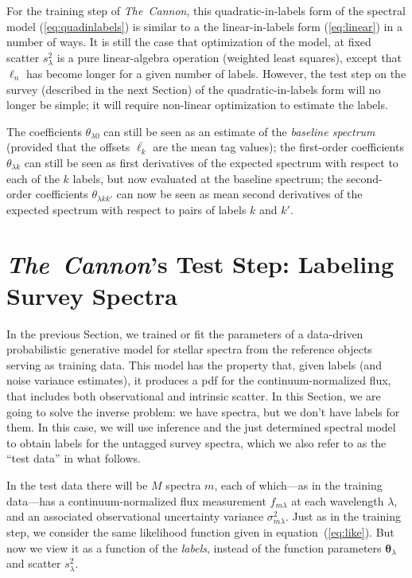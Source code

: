 \documentclass[12pt, preprint]{aastex}
\newcommand{\sectionname}{Section}
\newcommand{\tc}{\textsl{The~Cannon}}
\newcommand{\set}[1]{\bm{#1}}
\newcommand{\starlabel}{\ell}
\newcommand{\starlabelvec}{\set{\starlabel}}
\newcommand{\mean}[1]{\overline{#1}}
\begin{document}
For the training step of \tc , this quadratic-in-labels form of the spectral model (\ref{eq:quadinlabels}) is similar to a the linear-in-labels form (\ref{eq:linear}) in a number
of ways.
It is still the case that optimization of the model, at fixed scatter
$s_\lambda^2$ is a pure linear-algebra operation (weighted least
squares), except that $\starlabelvec_n$ has become longer for a given number of labels. 
However, the test step on the survey (described in the next Section) of the quadratic-in-labels form
 will no longer be simple; it will require non-linear
optimization to estimate the labels.

The coefficients $\theta_{\lambda 0}$ can still be seen as an estimate of the
\emph{baseline spectrum} (provided that the offsets $\mean{\starlabel_k}$ are the
mean tag values); the first-order coefficients $\theta_{\lambda k}$ can still
be seen as first derivatives of the expected spectrum with respect to
each of the $k$ labels, but now evaluated at the baseline spectrum; the
second-order coefficients $\theta_{\lambda kk'}$ can now be seen as mean
second derivatives of the expected spectrum with respect to pairs of
labels $k$ and $k'$.

\section{\tc's Test Step: Labeling Survey Spectra}
\label{sec:paramestimate}

In the previous Section, we trained or fit the parameters of
a data-driven probabilistic generative model for stellar spectra from the reference objects
serving as training data.
This model has the property that, given labels (and noise variance estimates), it produces a
pdf for the continuum-normalized flux, that includes both observational and intrinsic
scatter.
In this \sectionname, we are going to solve the inverse problem:
we have spectra, but we don't have labels for them.
In this case, we will use inference and the just determined spectral model
to obtain labels for the untagged survey
spectra, which we also refer to as the ``test data'' in what follows. 

In the test data there will be $M$ spectra $m$, each of which---as in
the training data---has a continuum-normalized flux measurement
$f_{m\lambda}$ at each wavelength $\lambda$, and an
associated observational uncertainty variance $\sigma_{m\lambda}^2$.
Just as in the training step, we consider the same likelihood function given in
equation~(\ref{eq:like}). But now we view it as a function of the \emph{labels},
instead of the function parameters $\set{\theta}_\lambda$ and
scatter $s_\lambda^2$.
\end{document}
